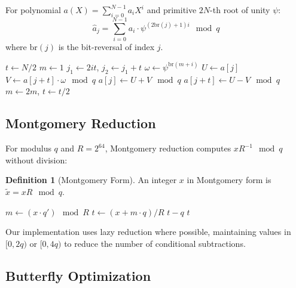 \documentclass[11pt,a4paper]{article}
\theoremstyle{definition}
\newtheorem{definition}{Definition}
\begin{document}
For polynomial $a(X) = \sum_{i=0}^{N-1} a_i X^i$ and primitive $2N$-th root of unity $\psi$:
\[
\hat{a}_j = \sum_{i=0}^{N-1} a_i \cdot \psi^{(2\text{br}(j)+1)i} \mod q
\]
where $\text{br}(j)$ is the bit-reversal of index $j$.

\begin{algorithm}
\caption{Cooley-Tukey NTT (Standard Form)}
\begin{algorithmic}[1]
\State $t \gets N/2$
\State $m \gets 1$
        \State $j_1 \gets 2it$, $j_2 \gets j_1 + t$
        \State $\omega \gets \psi^{\text{br}(m+i)}$
            \State $U \gets a[j]$
            \State $V \gets a[j+t] \cdot \omega \mod q$
            \State $a[j] \gets U + V \mod q$
            \State $a[j+t] \gets U - V \mod q$
        \EndFor
    \EndFor
    \State $m \gets 2m$, $t \gets t/2$
\EndWhile
\EndProcedure
\end{algorithmic}
\end{algorithm}

\subsection{Montgomery Reduction}

For modulus $q$ and $R = 2^{64}$, Montgomery reduction computes $xR^{-1} \mod q$ without division:

\begin{definition}[Montgomery Form]
An integer $x$ in Montgomery form is $\tilde{x} = xR \mod q$.
\end{definition}

\begin{algorithm}
\caption{Montgomery Reduction}
\begin{algorithmic}[1]
 
\State $m \gets (x \cdot q') \mod R$
\State $t \gets (x + m \cdot q) / R$
    \State \Return $t - q$
\Else
    \State \Return $t$
\EndIf
\EndProcedure
\end{algorithmic}
\end{algorithm}

Our implementation uses lazy reduction where possible, maintaining values in $[0, 2q)$ or $[0, 4q)$ to reduce the number of conditional subtractions.

\subsection{Butterfly Optimization}
\end{document}
